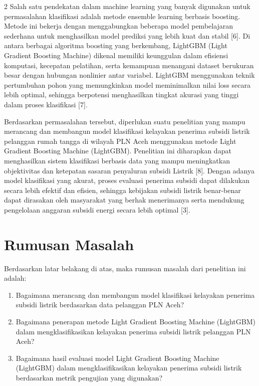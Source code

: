 \documentclass[12pt, a4paper, onecolumn, oneside]{report}
\begin{document}
\begin{spacing}{2}
Salah satu pendekatan dalam machine learning yang banyak digunakan untuk permasalahan klasifikasi adalah metode ensemble learning berbasis boosting. Metode ini bekerja dengan menggabungkan beberapa model pembelajaran sederhana untuk menghasilkan model prediksi yang lebih kuat dan stabil [6]. Di antara berbagai algoritma boosting yang berkembang, LightGBM (Light Gradient Boosting Machine) dikenal memiliki keunggulan dalam efisiensi komputasi, kecepatan pelatihan, serta kemampuan menangani dataset berukuran besar dengan hubungan nonlinier antar variabel. LightGBM menggunakan teknik pertumbuhan pohon yang memungkinkan model meminimalkan nilai loss secara lebih optimal, sehingga berpotensi menghasilkan tingkat akurasi yang tinggi dalam proses klasifikasi [7].

Berdasarkan permasalahan tersebut, diperlukan suatu penelitian yang mampu merancang dan membangun model klasifikasi kelayakan penerima subsidi listrik pelanggan rumah tangga di wilayah PLN Aceh menggunakan metode Light Gradient Boosting Machine (LightGBM). Penelitian ini diharapkan dapat menghasilkan sistem klasifikasi berbasis data yang mampu meningkatkan objektivitas dan ketepatan sasaran penyaluran subsidi Listrik [8]. Dengan adanya model klasifikasi yang akurat, proses evaluasi penerima subsidi dapat dilakukan secara lebih efektif dan efisien, sehingga kebijakan subsidi listrik benar-benar dapat dirasakan oleh masyarakat yang berhak menerimanya serta mendukung pengelolaan anggaran subsidi energi secara lebih optimal [3].

\section{Rumusan Masalah}
Berdasarkan latar belakang di atas, maka rumusan masalah dari penelitian ini adalah:
\begin{enumerate}
    \item Bagaimana merancang dan membangun model klasifikasi kelayakan penerima subsidi listrik berdasarkan data pelanggan PLN Aceh?
    \item Bagaimana penerapan metode Light Gradient Boosting Machine (LightGBM) dalam mengklasifikasikan kelayakan penerima subsidi listrik pelanggan PLN Aceh?
    \item Bagaimana hasil evaluasi model Light Gradient Boosting Machine (LightGBM) dalam mengklasifikasikan kelayakan penerima subsidi listrik berdasarkan metrik pengujian yang digunakan?
\end{enumerate}


\end{spacing}
\end{document}
